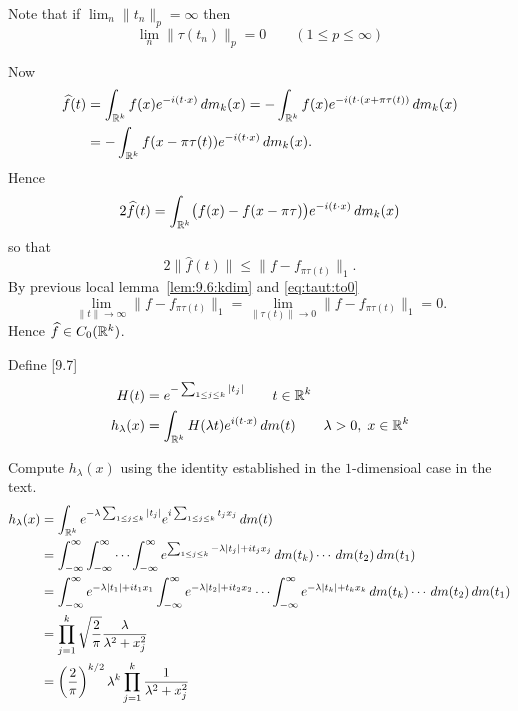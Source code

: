 \begin{enumerate}
\begin{thmproof}
Note that if \(\lim_n \|t_n\|_p=\infty\) then 
\begin{equation} \label{eq:taut:to0}
\lim_n \|\tau(t_n)\|_p = 0  \qquad (1\leq p \leq \infty)
\end{equation}

Now
\begin{align*}
\widehat{f}(t) 
&= \int_{\mathbb{R}^k} f(x)e^{-i(t\cdot x)}\,dm_k(x)
 = -\int_{\mathbb{R}^k} f(x)e^{-i(t\cdot (x + \pi\tau(t))}\,dm_k(x) \\
&= -\int_{\mathbb{R}^k} f(x - \pi\tau(t))e^{-i(t\cdot x)}\,dm_k(x).
\end{align*}
Hence 
\begin{equation*}
2\widehat{f}(t) 
= \int_{\mathbb{R}^k} \bigl(f(x) - f(x - \pi\tau)\bigr) e^{-i(t\cdot x)}\,dm_k(x)
\end{equation*}
so that
\begin{equation*}
2\|\widehat{f}(t)\| \leq \|f - f_{\pi\tau(t)}\|_1.
\end{equation*}
By previous local lemma~\ref{lem:9.6:kdim} and \eqref{eq:taut:to0}
\begin{equation*}
\lim_{\|t\|\to\infty} \|f - f_{\pi\tau(t)}\|_1 
= \lim_{\|\tau(t)\|\to 0} \|f - f_{\pi\tau(t)}\|_1 = 0.
\end{equation*}
Hence \(\widehat{f}\in C_0(\mathbb{R}^k)\).
\end{thmproof}


Define [9.7]
\begin{align*}
H(t) &= e^{-\sum_{1\leq j\leq k}|t_j|} \qquad t \in \mathbb{R}^k \\
h_\lambda(x) &= \int_{\mathbb{R}^k} H(\lambda t) e^{i(t\cdot x)}\,dm(t) 
 \qquad \lambda > 0, \; x\in\mathbb{R}^k
\end{align*}

Compute \(h_\lambda(x)\) using the identity established in the 
$1$-dimensioal case in the text.
\begin{align*}
h_\lambda(x) 
&= \int_{\mathbb{R}^k} e^{-\lambda\sum_{1\leq j\leq k}|t_j|} 
               e^{i\sum_{1\leq j\leq k} t_jx_j}\,dm(t) \\
&= 
    \int_{-\infty}^\infty
    \int_{-\infty}^\infty
    \cdots
    \int_{-\infty}^\infty
      e^{\sum_{1\leq j\leq k}-\lambda|t_j| + i t_jx_j}
    \,dm(t_k) 
     \cdots
    \,dm(t_2) 
    \,dm(t_1) 
    \\
&= 
    \int_{-\infty}^\infty
    e^{-\lambda|t_1|+it_1x_1}
    \int_{-\infty}^\infty
    e^{-\lambda|t_2|+it_2x_2}
    \cdots
    \int_{-\infty}^\infty
      e^{-\lambda|t_k| + t_kx_k}
    \,dm(t_k) 
     \cdots
    \,dm(t_2) 
    \,dm(t_1) 
    \\
&= \prod_{j=1}^k \sqrt{\frac{2}{\pi}}\frac{\lambda}{\lambda^2+x_j^2} \\
&= \left(\frac{2}{\pi}\right)^{k/2} \lambda^k 
   \prod_{j=1}^k \frac{1}{\lambda^2+x_j^2}
\end{align*}


\end{enumerate}
